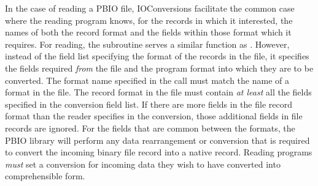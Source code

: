 In the case of reading a PBIO file, IOConversions facilitate the common case
where the reading program knows, for the records in which it interested, the
names of both the record format and the fields within those format which it
requires.  For reading, the subroutine  serves a
similar function as .  However, instead of
the field list specifying the format of the records in the file, it specifies
the fields required {\it from} the file and the program format into which they
are to be converted.  The format name specified in the
 call must match the name of a format in the file.
The record format in the file must contain {\it at least} all the fields
specified in the conversion field list.  If there are more fields in the file
record format than the reader specifies in the conversion, those additional
fields in file records are ignored.  For the fields that are common between
the formats, the PBIO library will perform any data rearrangement or conversion
that is required to convert the incoming binary file record into a native
record.  Reading programs {\it must} set a conversion for incoming data they
wish to have converted into comprehensible form.  

